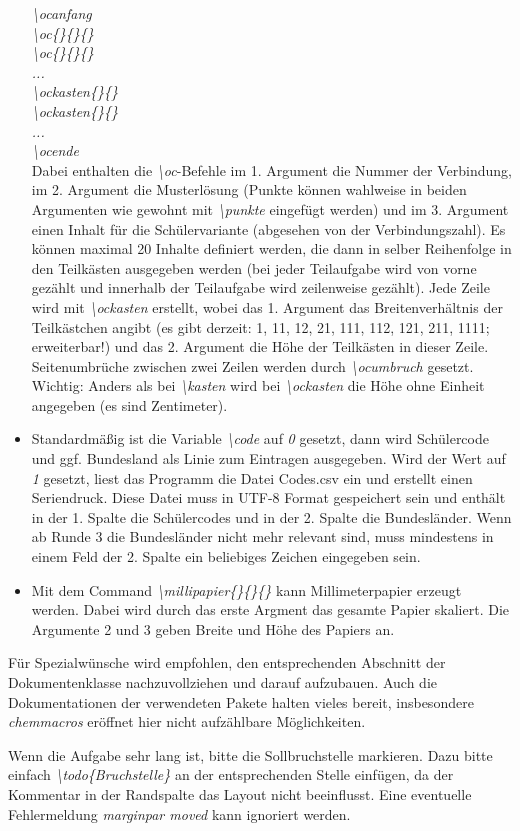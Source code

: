 \documentclass[./main.tex]{subfiles}
\begin{document}
\begin{itemize}
    \textit{\textbackslash ocanfang \\\textbackslash oc\{\}\{\}\{\} \\\textbackslash oc\{\}\{\}\{\} \\...\\\textbackslash ockasten\{\}\{\}\\\textbackslash ockasten\{\}\{\}\\...\\\textbackslash ocende}\\
    Dabei enthalten die \textit{\textbackslash oc}-Befehle im 1. Argument die Nummer der Verbindung, im 2. Argument die Musterl\"osung (Punkte k\"onnen wahlweise in beiden Argumenten wie gewohnt mit \textit{\textbackslash punkte} eingef\"ugt werden) und im 3. Argument einen Inhalt f\"ur die Sch\"ulervariante (abgesehen von der Verbindungszahl). Es k\"onnen maximal 20 Inhalte definiert werden, die dann in selber Reihenfolge in den Teilk\"asten ausgegeben werden (bei jeder Teilaufgabe wird von vorne gez\"ahlt und innerhalb der Teilaufgabe wird zeilenweise gez\"ahlt). Jede Zeile wird mit \textit{\textbackslash ockasten} erstellt, wobei das 1. Argument das Breitenverh\"altnis der Teilk\"astchen angibt (es gibt derzeit: 1, 11, 12, 21, 111, 112, 121, 211, 1111; erweiterbar!) und das 2. Argument die H\"ohe der Teilk\"asten in dieser Zeile. Seitenumbr\"uche zwischen zwei Zeilen werden durch \textit{\hypertarget{ocumbruch}{\textbackslash ocumbruch}} gesetzt. \\Wichtig: Anders als bei \textit{\textbackslash kasten} wird bei \textit{\textbackslash ockasten} die H\"ohe ohne Einheit angegeben (es sind Zentimeter). 
    \item Standardm\"a\ss{}ig ist die Variable \hypertarget{code}{\textit{\textbackslash code}} auf \textit{0} gesetzt, dann wird Sch\"ulercode und ggf. Bundesland als Linie zum Eintragen ausgegeben. Wird der Wert auf \textit{1} gesetzt, liest das Programm die Datei Codes.csv ein und erstellt einen Seriendruck. Diese Datei muss in UTF-8 Format gespeichert sein und enth\"alt in der 1. Spalte die Sch\"ulercodes und in der 2. Spalte die Bundesl\"ander. Wenn ab Runde 3 die Bundesl\"ander nicht mehr relevant sind, muss mindestens in einem Feld der 2. Spalte ein beliebiges Zeichen eingegeben sein.
    \item Mit dem Command \textit{\textbackslash millipapier\{\}\{\}\{\}} kann Millimeterpapier erzeugt werden. Dabei wird durch das erste Argment das gesamte Papier skaliert. Die Argumente 2 und 3 geben Breite und H\"ohe des Papiers an.
\end{itemize}
F\"ur Spezialw\"unsche wird empfohlen, den entsprechenden Abschnitt der Dokumentenklasse nachzuvollziehen und darauf aufzubauen. Auch die Dokumentationen der verwendeten Pakete halten vieles bereit, insbesondere \textit{chemmacros} er\"offnet hier nicht aufz\"ahlbare M\"oglichkeiten. \par 
Wenn die Aufgabe sehr lang ist, bitte die Sollbruchstelle markieren. Dazu bitte einfach \textit{\textbackslash{}todo\{Bruchstelle\}} an der entsprechenden Stelle einf\"ugen, da der Kommentar in der Randspalte das Layout nicht beeinflusst. Eine eventuelle Fehlermeldung \textit{marginpar moved} kann ignoriert werden. 
\end{document}
